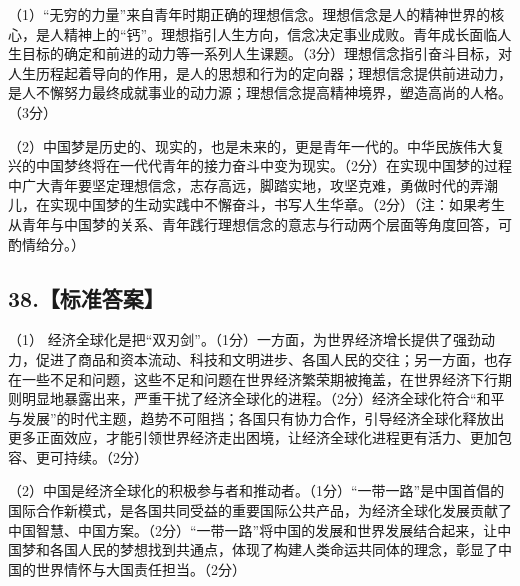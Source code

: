 \documentclass[UTF8,11pt]{ctexart}
\begin{document}
（1）“无穷的力量”来自青年时期正确的理想信念。理想信念是人的精神世界的核心，是人精神上的“钙”。理想指引人生方向，信念决定事业成败。青年成长面临人生目标的确定和前进的动力等一系列人生课题。（3分）理想信念指引奋斗目标，对人生历程起着导向的作用，是人的思想和行为的定向器；理想信念提供前进动力，是人不懈努力最终成就事业的动力源；理想信念提高精神境界，塑造高尚的人格。（3分）


（2）中国梦是历史的、现实的，也是未来的，更是青年一代的。中华民族伟大复兴的中国梦终将在一代代青年的接力奋斗中变为现实。（2分）在实现中国梦的过程中广大青年要坚定理想信念，志存高远，脚踏实地，攻坚克难，勇做时代的弄潮儿，在实现中国梦的生动实践中不懈奋斗，书写人生华章。（2分）（注：如果考生从青年与中国梦的关系、青年践行理想信念的意志与行动两个层面等角度回答，可酌情给分。）


\subsection*{38.【标准答案】}

（1） 经济全球化是把“双刃剑”。（1分）一方面，为世界经济增长提供了强劲动力，促进了商品和资本流动、科技和文明进步、各国人民的交往；另一方面，也存在一些不足和问题，这些不足和问题在世界经济繁荣期被掩盖，在世界经济下行期则明显地暴露出来，严重干扰了经济全球化的进程。（2分）经济全球化符合“和平与发展”的时代主题，趋势不可阻挡；各国只有协力合作，引导经济全球化释放出更多正面效应，才能引领世界经济走出困境，让经济全球化进程更有活力、更加包容、更可持续。（2分）


（2）中国是经济全球化的积极参与者和推动者。（1分）“一带一路”是中国首倡的国际合作新模式，是各国共同受益的重要国际公共产品，为经济全球化发展贡献了中国智慧、中国方案。（2分）“一带一路”将中国的发展和世界发展结合起来，让中国梦和各国人民的梦想找到共通点，体现了构建人类命运共同体的理念，彰显了中国的世界情怀与大国责任担当。（2分）
\end{document}
